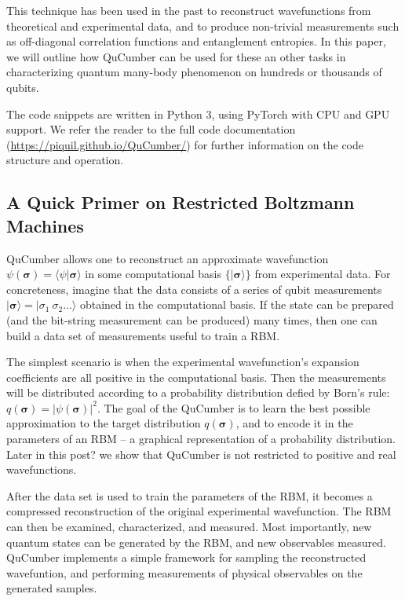 \documentclass[submission, Phys]{SciPost}
\begin{document}
This technique has been used in the past to reconstruct wavefunctions from theoretical and experimental data, and to produce non-trivial measurements such as off-diagonal correlation functions and entanglement entropies.
In this paper, we will outline how QuCumber can be used for these an other tasks in characterizing quantum many-body phenomenon on hundreds or thousands of qubits.

The code snippets are written in Python 3, using PyTorch with CPU and GPU support.  We refer the reader to the full code documentation (\url{https://piquil.github.io/QuCumber/}) for further information on the code structure and operation.


\subsection{A Quick Primer on Restricted Boltzmann Machines}

QuCumber allows one to reconstruct an approximate wavefunction $\psi( \boldsymbol{\sigma} )  = \langle \psi \vert \boldsymbol{\sigma} \rangle$ in some computational basis $\{ \vert \boldsymbol{ \sigma} \rangle \}$ from experimental data.   For concreteness, imagine that the data consists of a series of qubit measurements $\vert {\boldsymbol{ \sigma}} \rangle = \vert { \sigma}_1~{ \sigma}_2 \dots \rangle$ obtained in the computational basis. If the state can be prepared (and the bit-string measurement can be produced) many times, then one can build a data set of measurements useful to train a RBM.

The simplest scenario is when the experimental wavefunction's expansion coefficients are all positive in the computational basis.  
Then the measurements will be distributed according to a probability distribution defied by Born's rule: $q(\boldsymbol{\sigma}) = | \psi( \boldsymbol{\sigma} ) |^2$.
The goal of the QuCumber is to learn the best possible approximation to the target distribution $q(\boldsymbol{\sigma})$, and to encode it in the parameters of an RBM -- a graphical representation of a probability distribution. Later in this post? we show that QuCumber is not restricted to positive and real wavefunctions.

After the data set is used to train the parameters of the RBM, it becomes a compressed reconstruction of the original experimental wavefunction.  The RBM can then be examined, characterized, and measured.  Most importantly, new quantum states can be generated by the RBM, and new observables measured.  QuCumber implements a simple framework for sampling the reconstructed wavefuntion, and performing measurements of physical observables on the generated samples.
\end{document}
